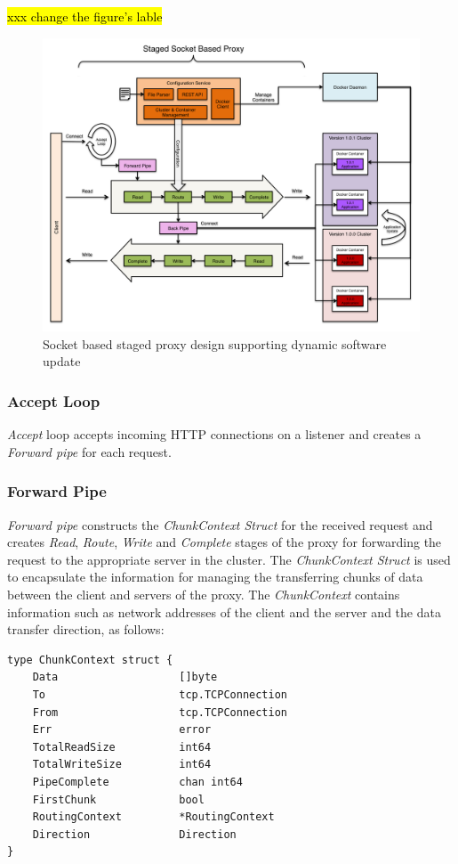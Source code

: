 \documentclass[a4paper,11pt,twoside]{report}
\begin{document}
\hl{xxx change the figure's lable}
\begin{figure}[!ht]
  \centering
     \includegraphics[scale=0.30]{proxy}
  \caption{Socket based staged proxy design supporting dynamic software update}
  \label{proxy}
\end{figure}

\subsubsection*{Accept Loop} 
\textit{Accept} loop accepts incoming HTTP connections on a listener and creates a \textit{Forward pipe} for each request.

\subsubsection*{Forward Pipe} 
\textit{Forward pipe} constructs the \textit{ChunkContext Struct} for the received request and creates \textit{Read}, \textit{Route}, \textit{Write} and \textit{Complete} stages of the proxy for forwarding the request to the appropriate server in the cluster. The \textit{ChunkContext Struct} is used to encapsulate the information for managing the transferring chunks of data between the client and servers of the proxy. The \textit{ChunkContext} contains information such as network addresses of the client and the server and the data transfer direction, as follows: \bigskip  

\begin{lstlisting}[language=terminal, xleftmargin= .5in, xrightmargin= 1.75in]
type ChunkContext struct {
	Data                   []byte
	To                     tcp.TCPConnection
	From                   tcp.TCPConnection
	Err                    error
	TotalReadSize          int64
	TotalWriteSize         int64
	PipeComplete           chan int64
	FirstChunk             bool
	RoutingContext         *RoutingContext
	Direction              Direction
}
\end{lstlisting} 
\end{document}
